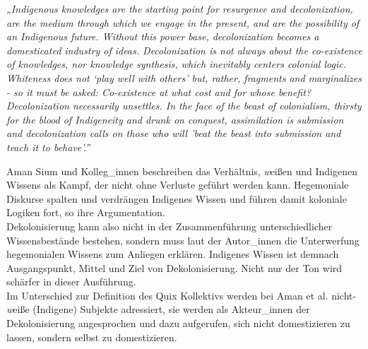 \begin{myenv}
  \textit{
  „Indigenous knowledges are the starting point for resurgence and
  decolonization, are the medium through which we engage in the present, and
  are the possibility of an Indigenous future. Without this power base,
  decolonization becomes a domesticated industry of ideas. Decolonization is
  not always about the co-existence of knowledges, nor knowledge synthesis,
  which inevitably centers colonial logic. Whiteness does not ‘play well with
  others’ but, rather, fragments and marginalizes - so it must be asked:
  Co-existence at what cost and for whose benefit? Decolonization necessarily
  unsettles. In the face of the beast of colonialism, thirsty for the blood of
  Indigeneity and drunk on conquest, assimilation is submission and
  decolonization calls on those who will 'beat the beast into submission and
  teach it to behave'.”\footnotemark{} }
\end{myenv}
Aman Sium und Kolleg\_innen beschreiben das Verhältnis, \textit{w}eißen und Indigenen
Wissens als Kampf, der nicht ohne Verluste geführt werden kann. Hegemoniale
Diskurse spalten und verdrängen Indigenes Wissen und führen damit koloniale
Logiken fort, so ihre Argumentation.\\
Dekolonisierung kann also nicht in der
Zusammenführung unterschiedlicher Wissensbestände bestehen, sondern muss laut
der Autor\_innen die Unterwerfung hegemonialen Wissens zum Anliegen erklären.
Indigenes Wissen ist demnach Ausgangspunkt, Mittel und Ziel von
Dekolonisierung. Nicht nur der Ton wird schärfer in dieser Ausführung.\\
Im
Unterschied zur Definition des Quix Kollektivs werden bei Aman et al.
nicht-\textit{w}eiße (Indigene) Subjekte adressiert, sie werden als Akteur\_innen der
Dekolonisierung angesprochen und dazu aufgerufen, sich nicht domestizieren zu
lassen, sondern selbst zu domestizieren.\\

